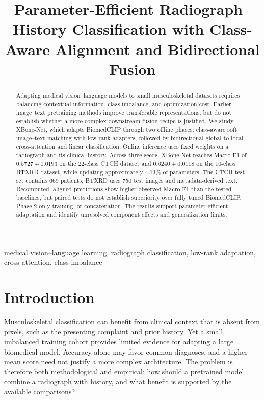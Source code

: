 \documentclass[conference,a4paper]{IEEEtran}
\begin{document}
\title{Parameter-Efficient Radiograph--History Classification with Class-Aware Alignment and Bidirectional Fusion}
\author{
}
\maketitle

\begin{abstract}
Adapting medical vision--language models to small musculoskeletal datasets requires balancing contextual information, class imbalance, and optimization cost. Earlier image--text pretraining methods improve transferable representations, but do not establish whether a more complex downstream fusion recipe is justified. We study XBone-Net, which adapts BiomedCLIP through two offline phases: class-aware soft image--text matching with low-rank adapters, followed by bidirectional global-to-local cross-attention and linear classification. Online inference uses fixed weights on a radiograph and its clinical history. Across three seeds, XBone-Net reaches Macro-F1 of $0.5727\pm0.0193$ on the 22-class CTCH dataset and $0.6240\pm0.0118$ on the 10-class BTXRD dataset, while updating approximately 4.13\% of parameters. The CTCH test set contains 669 patients; BTXRD uses 750 test images and metadata-derived text. Recomputed, aligned predictions show higher observed Macro-F1 than the tested baselines, but paired tests do not establish superiority over fully tuned BiomedCLIP, Phase-2-only training, or concatenation. The results support parameter-efficient adaptation and identify unresolved component effects and generalization limits.
\end{abstract}
\begin{IEEEkeywords}
medical vision--language learning, radiograph classification, low-rank adaptation, cross-attention, class imbalance
\end{IEEEkeywords}

\section{Introduction}
Musculoskeletal classification can benefit from clinical context that is absent from pixels, such as the presenting complaint and prior history. Yet a small, imbalanced training cohort provides limited evidence for adapting a large biomedical model. Accuracy alone may favor common diagnoses, and a higher mean score need not justify a more complex architecture. The problem is therefore both methodological and empirical: how should a pretrained model combine a radiograph with history, and what benefit is supported by the available comparisons?
\end{document}
